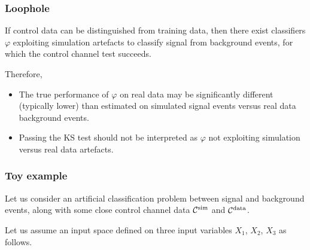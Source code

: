 \documentclass{beamer}
\begin{document}

\begin{frame}
\frametitle{Loophole}

If control data can be distinguished from training data,
then there exist classifiers $\varphi$ exploiting simulation artefacts
 to classify signal from background events, for which {\color{red}the
control channel test succeeds}.

\vspace{0.5cm}

Therefore,

\begin{itemize}

\item The true performance of $\varphi$ on real data may be significantly
different (typically lower) than estimated on simulated signal events versus
real data background events.

\item Passing the KS test should not be interpreted as $\varphi$
not exploiting simulation versus real data artefacts.

\end{itemize}

\end{frame}


\begin{frame}
\frametitle{Toy example}

Let us consider an artificial classification problem between signal and
background events, along with some close control channel data ${\cal
C}^\text{sim}$ and ${\cal C}^\text{data}$.

\vspace{0.5cm}

Let us assume an input space defined on three input variables $X_1$, $X_2$,
$X_3$ as follows.

\end{frame}

\end{document}
